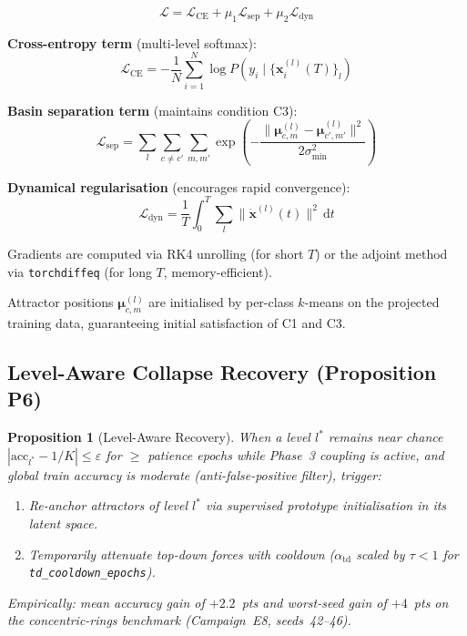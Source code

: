 \documentclass[11pt,a4paper]{article}
\newtheorem{proposition}[theorem]{Proposition}
\begin{document}
\begin{equation}
  \mathcal{L} = \mathcal{L}_{\mathrm{CE}} + \mu_1 \mathcal{L}_{\mathrm{sep}} + \mu_2 \mathcal{L}_{\mathrm{dyn}}
\label{eq:loss}
\end{equation}

\textbf{Cross-entropy term} (multi-level softmax):
\begin{equation}
  \mathcal{L}_{\mathrm{CE}} = -\frac{1}{N} \sum_{i=1}^{N} \log P(y_i \mid \{\mathbf{x}_i^{(l)}(T)\}_l)
\end{equation}

\textbf{Basin separation term} (maintains condition C3):
\begin{equation}
  \mathcal{L}_{\mathrm{sep}} = \sum_{l} \sum_{c \ne c'} \sum_{m,m'}
    \exp\!\left(-\frac{\|\boldsymbol{\mu}^{(l)}_{c,m} - \boldsymbol{\mu}^{(l)}_{c',m'}\|^2}
                       {2\sigma^2_{\min}}\right)
\end{equation}

\textbf{Dynamical regularisation} (encourages rapid convergence):
\begin{equation}
  \mathcal{L}_{\mathrm{dyn}} = \frac{1}{T}\int_0^T \sum_l \|\dot{\mathbf{x}}^{(l)}(t)\|^2\, \mathrm{d}t
\end{equation}

Gradients are computed via RK4 unrolling (for short $T$) or the adjoint method
\cite{chen2018neural} via \texttt{torchdiffeq} (for long $T$, memory-efficient).

Attractor positions $\boldsymbol{\mu}^{(l)}_{c,m}$ are initialised by per-class $k$-means on
the projected training data, guaranteeing initial satisfaction of C1 and C3.

\subsection{Level-Aware Collapse Recovery (Proposition P6)}

\begin{proposition}[Level-Aware Recovery]
When a level $l^*$ remains near chance
$|\mathrm{acc}_{l^*} - 1/K| \le \varepsilon$ for $\ge$ patience epochs while Phase~3 coupling is
active, and global train accuracy is moderate (anti-false-positive filter), trigger:
\begin{enumerate}
  \item Re-anchor attractors of level $l^*$ via supervised prototype initialisation in its
        latent space.
  \item Temporarily attenuate top-down forces with cooldown ($\alpha_{\mathrm{td}}$ scaled by
        $\tau < 1$ for \texttt{td\_cooldown\_epochs}).
\end{enumerate}
Empirically: mean accuracy gain of $+2.2$~pts and worst-seed gain of $+4$~pts on the
concentric-rings benchmark (Campaign~E8, seeds~42--46).
\end{proposition}
\end{document}
